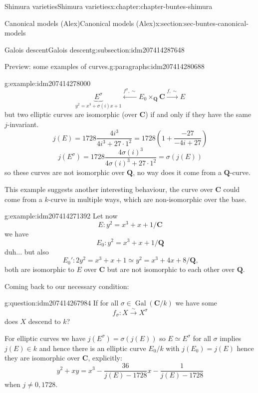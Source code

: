 \documentclass[oneside,10pt,]{book}
\numberwithin{equation}{section}
\newcommand{\QQ}{\mathbf{Q}}
\newcommand{\CC}{\mathbf{C}}
\newcommand{\Gal}[2]{\operatorname{Gal}(#1/#2)}
\begin{document}
\begin{chapterptx}{Shimura varieties}{}{Shimura varieties}{}{}{x:chapter:chapter-buntes-shimura}
\begin{sectionptx}{Canonical models (Alex)}{}{Canonical models (Alex)}{}{}{x:section:sec-buntes-canonical-models}
\begin{subsectionptx}{Galois descent}{}{Galois descent}{}{}{g:subsection:idm207414287648}
\begin{paragraphs}{Preview: some examples of curves.}{g:paragraphs:idm207414280688}
\begin{example}{}{g:example:idm207414278000}
\begin{equation*}
\underbrace{E^\sigma}_{y^2 = x^3 + \sigma(i)x + 1} \xleftarrow{f^\sigma, \sim} E_0 \times_\QQ \CC \xrightarrow{f,\sim} E
\end{equation*}
but two elliptic curves are isomorphic (over \(\CC\)) if and only if they have the same \(j\)-invariant.%
\begin{equation*}
j(E) = 1728 \frac{4i^3}{4i^3 + 27\cdot 1^2} = 1728\left(1+ \frac{ - 27}{-4i + 27}\right)
\end{equation*}
%
\begin{equation*}
j(E^\sigma) = 1728 \frac{4\sigma(i)^3}{4\sigma(i)^3 + 27\cdot 1^2} = \sigma(j(E))
\end{equation*}
so these curves are not isomorphic over \(\QQ\), no way does it come from a \(\QQ\)-curve.%
\end{example}
This example suggests another interesting behaviour, the curve over \(\CC\) could come from  a \(k\)-curve in multiple ways, which are non-isomorphic over the base.%
\begin{example}{}{g:example:idm207414271392}%
Let now%
\begin{equation*}
E \colon y^2 = x^3 + x + 1/\CC
\end{equation*}
we have%
\begin{equation*}
E_0 \colon y^2 = x^3 + x + 1/\QQ
\end{equation*}
duh... but also%
\begin{equation*}
E_0' \colon 2 y^2 = x^3 + x + 1 \simeq y^2 = x^3 + 4 x + 8/\QQ\text{,}
\end{equation*}
both are isomorphic to \(E\) over \(\CC\) but are not isomorphic to each other over \(\QQ\).%
\end{example}
Coming back to our necessary condition:%
\begin{question}{}{g:question:idm207414267984}%
If for all \(\sigma \in \Gal{\CC}{k}\) we have some%
\begin{equation*}
f_\sigma \colon X\xrightarrow{\sim} X^\sigma
\end{equation*}
does \(X\) descend to \(k\)?%
\end{question}
For elliptic curves we have \(j(E^\sigma) = \sigma(j(E))\) so \(E \simeq E^\sigma\) for all \(\sigma\) implies \(j(E) \in k\) and hence there is an elliptic curve \(E_0/ k\) with \(j(E_0) = j(E)\) hence they are isomorphic over \(\CC\), explicitly:%
\begin{equation*}
y^2 + xy = x^3 - \frac{36}{j(E) - 1728} x - \frac{1}{j(E) - 1728}
\end{equation*}
when \(j\ne 0,1728\).%

\end{paragraphs}
\end{subsectionptx}
\end{sectionptx}
\end{chapterptx}
\end{document}
